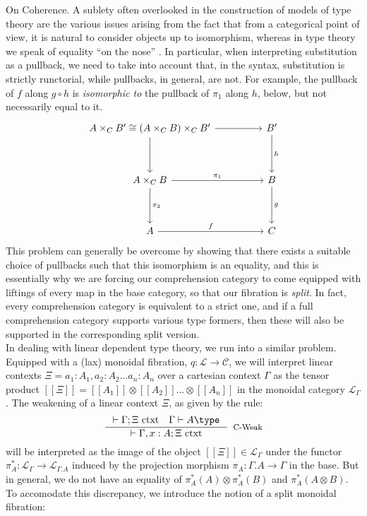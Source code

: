 \begin{remrk}On Coherence. A sublety often overlooked in the construction of models of type theory are the various issues arising from the fact that from a categorical point of view, it is natural to consider objects up to isomorphism, whereas in type theory we speak of equality ``on the nose'' \cite{lccc}. In particular, when interpreting substitution as a pullback, we need to take into account that, in the syntax, substitution is strictly runctorial, while pullbacks, in general, are not. For example, the pullback of $f$ along $g \circ h$ is \textit{isomorphic to} the pullback of $\pi_1$ along $h$, below, but not necessarily equal to it.
  \[
    \ti
    A \times_C B' \cong (A \times_C B) \times_C B'  \ar[r] \ar[d] & B' \ar[d, "h"]\\
    A \times_C B \ar[r, "\pi_1"] \ar[d, "\pi_2"] & B \ar[d, "g"]\\
    A \ar[r,"f"] & C
    \kz
  \]
  This problem can generally be overcome by showing that there exists a suitable choice of pullbacks such that this isomorphism is an equality, and this is essentially why we are forcing our comprehension category to come equipped with liftings of every map in the base category, so that our fibration is \textit{split}. In fact, every comprehension category is equivalent to a strict one, and if a full comprehension category supports various type formers, then these will also be supported in the corresponding split version. \cite{pllcoherence}\\
  In dealing with linear dependent type theory, we run into a similar problem. Equipped with a (lax) monoidal fibration, $q : \mathcal{L} \to \mathcal{C}$, we will interpret linear contexts $\Xi = a_1 : A_1, a_2 : A_2 \dots a_n : A_n$ over a cartesian context $\Gamma$ as the tensor product $[[\Xi]] = [[A_1]] \otimes [[A_2]] \dots \otimes [[A_n]]$ in the monoidal category $\mathcal{L}_\Gamma$. The weakening of a linear context $\Xi$, as given by the rule:
  \[\inference{\vdash \Gamma; \Xi \text{ ctxt} \quad \Gamma \vdash A \type}{\vdash \Gamma, x : A; \Xi \text{ ctxt}}[C-Weak]
  \]
  will be interpreted as the image of the object $[[\Xi]] \in \mathcal{L}_\Gamma$ under the functor $\pi_A^* : \mathcal{L}_\Gamma \to \mathcal{L}_{\Gamma.A}$ induced by the projection morphism $\pi_A : \Gamma.A \to \Gamma$ in the base. But in general, we do not have an equality of $\pi_A^*(A) \otimes \pi_A^*(B)$ and $\pi_A^*(A \otimes B)$. To accomodate this discrepancy, we introduce the notion of a split monoidal fibration:
\end{remrk}

